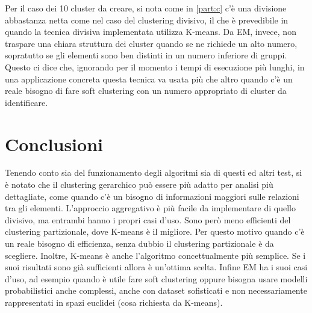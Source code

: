\documentclass{llncs}
\begin{document}
	Per il caso dei 10 cluster da creare, si nota come in \ref{part:c} c'è una divisione abbastanza netta come nel caso del clustering divisivo, il che è prevedibile in quando la tecnica divisiva 
	implementata utilizza K-means. Da EM, invece, non traspare una chiara struttura dei cluster quando se ne richiede un alto numero, sopratutto se gli elementi sono ben distinti in un numero inferiore di gruppi.
	Questo ci dice che, ignorando per il momento i tempi di esecuzione più lunghi, in una applicazione concreta questa tecnica va usata più che altro quando c'è un reale bisogno di fare soft clustering
	con un numero appropriato di cluster da identificare.  
	\clearpage
	\section{Conclusioni}
	Tenendo conto sia del funzionamento degli algoritmi sia di questi ed altri test, si è notato che il clustering gerarchico può essere più adatto per analisi più dettagliate, come quando c'è un
	bisogno di informazioni maggiori sulle relazioni tra gli elementi. L'approccio aggregativo è più facile da implementare di quello divisivo, ma entrambi hanno i propri casi d'uso. Sono però meno
	efficienti del clustering partizionale, dove K-means è il migliore. Per questo motivo quando c'è un reale bisogno di efficienza, senza dubbio il clustering partizionale è da scegliere. Inoltre,
	K-means è anche l'algoritmo concettualmente più semplice. Se i suoi risultati sono già sufficienti allora è un'ottima scelta. Infine EM ha i suoi casi d'uso, ad esempio quando è utile
	fare soft clustering oppure bisogna usare modelli probabilistici anche complessi, anche con dataset sofisticati e non necessariamente rappresentati in spazi euclidei 
	(cosa richiesta da K-means).
\end{document}
